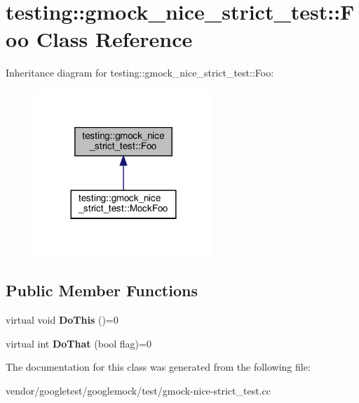 \hypertarget{classtesting_1_1gmock__nice__strict__test_1_1_foo}{}\section{testing\+:\+:gmock\+\_\+nice\+\_\+strict\+\_\+test\+:\+:Foo Class Reference}
\label{classtesting_1_1gmock__nice__strict__test_1_1_foo}


Inheritance diagram for testing\+:\+:gmock\+\_\+nice\+\_\+strict\+\_\+test\+:\+:Foo\+:
\nopagebreak
\begin{figure}[H]
\begin{center}
\leavevmode
\includegraphics[width=192pt]{classtesting_1_1gmock__nice__strict__test_1_1_foo__inherit__graph}
\end{center}
\end{figure}
\subsection*{Public Member Functions}
\begin{DoxyCompactItemize}
\item 
\mbox{\label{classtesting_1_1gmock__nice__strict__test_1_1_foo_a79a3cdbd8d9d9f6bc87580563b0d7cec}} 
virtual void {\bfseries Do\+This} ()=0
\item 
\mbox{\label{classtesting_1_1gmock__nice__strict__test_1_1_foo_a8527a459b03f333a809a3376311a9f8b}} 
virtual int {\bfseries Do\+That} (bool flag)=0
\end{DoxyCompactItemize}


The documentation for this class was generated from the following file\+:\begin{DoxyCompactItemize}
\item 
vendor/googletest/googlemock/test/gmock-\/nice-\/strict\+\_\+test.\+cc\end{DoxyCompactItemize}
